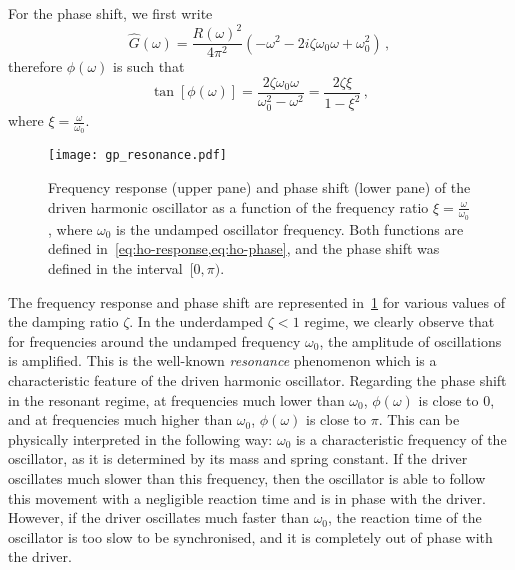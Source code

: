 For the phase shift, we first write
\begin{equation}
  \hat{G}(\omega)=\frac{R(\omega)^2}{4\pi^2}(-\omega^2-2i\zeta\omega_0\omega+\omega_0^2)\,,
\end{equation}
therefore $\phi(\omega)$ is such that
\begin{equation}
  \tan[\phi(\omega)]=\frac{2\zeta\omega_0\omega}{\omega_0^2-\omega^2}
  =\frac{2\zeta\xi}{1-\xi^2}\,,
  \label{eq:ho-phase}
\end{equation}
where $\xi=\frac{\omega}{\omega_0}$.
\begin{figure}[p]
  \centering
  \texttt{[image: gp\_resonance.pdf]}
  \caption{Frequency response (upper pane) and phase shift (lower pane) of the driven
    harmonic oscillator as a function of the frequency ratio $\xi=\frac{\omega}{\omega_0}$,
    where $\omega_0$ is the undamped oscillator frequency. Both functions are defined
    in~\cref{eq:ho-response,eq:ho-phase}, and the phase shift was defined in the
  interval~$[0,\pi)$.}
  \label{fig:resonance}
\end{figure}

The frequency response and phase shift are represented in~\cref{fig:resonance} for various
values of the damping ratio $\zeta$. In the underdamped $\zeta<1$ regime, we clearly
observe that for frequencies around the undamped frequency $\omega_0$, the amplitude of
oscillations is amplified. This is the well-known \emph{resonance} phenomenon which is a
characteristic feature of the driven harmonic oscillator. Regarding the phase shift in the
resonant regime, at frequencies much lower than $\omega_0$, $\phi(\omega)$ is close to
$0$, and at frequencies much higher than $\omega_0$, $\phi(\omega)$ is close to $\pi$.
This can be physically interpreted in the following way: $\omega_0$ is a characteristic
frequency of the oscillator, as it is determined by its mass and spring constant. If the
driver oscillates much slower than this frequency, then the oscillator is able to follow
this movement with a negligible reaction time and is in phase with the driver. However,
if the driver oscillates much faster than $\omega_0$, the reaction time of the oscillator
is too slow to be synchronised, and it is completely out of phase with the driver.
